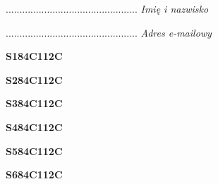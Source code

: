 \begin{turn}{90}\begin{minipage}{\linewidth} \vspace{20mm} ................................................  \textit{Imię i nazwisko}\end{minipage}\end{turn}

\begin{turn}{90}\begin{minipage}{\linewidth} \vspace{20mm} ................................................  \textit{Adres e-mailowy}\end{minipage}\end{turn}

\begin{turn}{90}\huge \begin{minipage}{\linewidth} \vspace{10mm}\textbf{S184C112C}\end{minipage}\end{turn}

\begin{turn}{90}\huge \begin{minipage}{\linewidth} \vspace{10mm}\textbf{S284C112C}\end{minipage}\end{turn}

\begin{turn}{90}\huge \begin{minipage}{\linewidth} \vspace{10mm}\textbf{S384C112C}\end{minipage}\end{turn}

\begin{turn}{90}\huge \begin{minipage}{\linewidth} \vspace{10mm}\textbf{S484C112C}\end{minipage}\end{turn}

\begin{turn}{90}\huge \begin{minipage}{\linewidth} \vspace{10mm}\textbf{S584C112C}\end{minipage}\end{turn}

\begin{turn}{90}\huge \begin{minipage}{\linewidth} \vspace{10mm}\textbf{S684C112C}\end{minipage}\end{turn}

